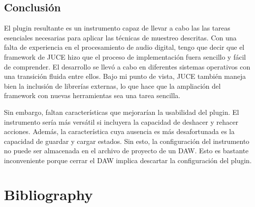 \documentclass[12pt, a4paper, hidelinks]{article}
\begin{document}
	\newpage
	\subsection{Conclusión}
	El plugin resultante es un instrumento capaz de llevar a cabo las las tareas esenciales necesarias para aplicar las técnicas de muestreo descritas.	Con una falta de experiencia en el procesamiento de audio digital, tengo que decir que el framework de JUCE hizo que el proceso de implementación fuera sencillo y fácil de comprender. El desarrollo se llevó a cabo en diferentes sistemas operativos con una transición fluida entre ellos. Bajo mi punto de vista, JUCE también maneja bien la inclusión de librerías externas, lo que hace que la ampliación del framework con nuevas herramientas sea una tarea sencilla.
	
	Sin embargo, faltan características que mejorarían la usabilidad del plugin. El instrumento sería más versátil si incluyera la capacidad de deshacer y rehacer acciones. Además, la característica cuya ausencia es más desafortunada es la capacidad de guardar y cargar estados. Sin esto, la configuración del instrumento no puede ser almacenada en el archivo de proyecto de un DAW. Esto es bastante inconveniente porque cerrar el DAW implica descartar la configuración del plugin.
	


	\newpage
	\section{Bibliography}
	\printbibliography
	
\end{document}

